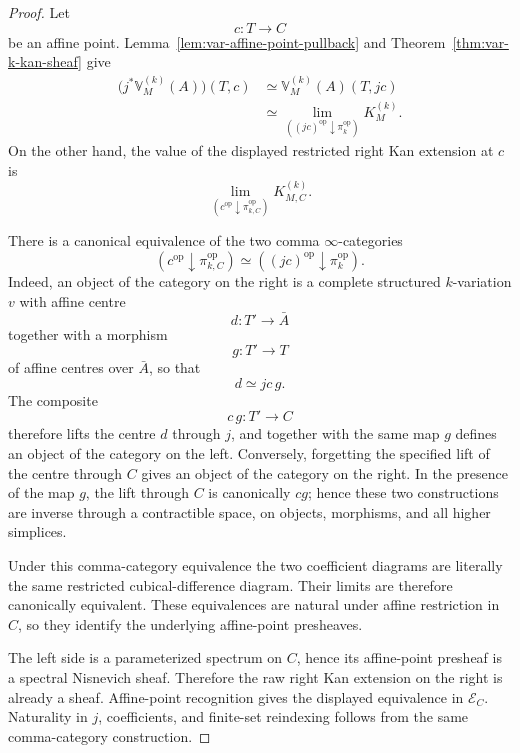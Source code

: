 \begin{proof}
Let
\[
    c:T\longrightarrow C
\]
be an affine point.  Lemma~\ref{lem:var-affine-point-pullback} and Theorem~\ref{thm:var-k-kan-sheaf} give
\[
\begin{aligned}
    \bigl(j^*\mathbb V_M^{(k)}(A)\bigr)(T,c)
    &\simeq
    \mathbb V_M^{(k)}(A)(T,jc)\\
    &\simeq
    \lim_{
      ((jc)^{\mathrm{op}}\downarrow\pi_k^{\mathrm{op}})
    }
    K_M^{(k)}.
\end{aligned}
\]
On the other hand, the value of the displayed restricted right Kan extension at \(c\) is
\[
    \lim_{
      (c^{\mathrm{op}}\downarrow\pi_{k,C}^{\mathrm{op}})
    }
    K_{M,C}^{(k)}.
\]

There is a canonical equivalence of the two comma \(\infty\)-categories
\[
    \boxed{
    (c^{\mathrm{op}}\downarrow\pi_{k,C}^{\mathrm{op}})
    \simeq
    ((jc)^{\mathrm{op}}\downarrow\pi_k^{\mathrm{op}}).
    }
\]
Indeed, an object of the category on the right is a complete structured \(k\)-variation \(v\) with affine centre
\[
    d:T'\longrightarrow\bar A
\]
together with a morphism
\[
    g:T'\longrightarrow T
\]
of affine centres over \(\bar A\), so that
\[
    d\simeq jc\,g.
\]
The composite
\[
    c\,g:T'\longrightarrow C
\]
therefore lifts the centre \(d\) through \(j\), and together with the same map \(g\) defines an object of the category on the left.  Conversely, forgetting the specified lift of the centre through \(C\) gives an object of the category on the right.  In the presence of the map \(g\), the lift through \(C\) is canonically \(cg\); hence these two constructions are inverse through a contractible space, on objects, morphisms, and all higher simplices.

Under this comma-category equivalence the two coefficient diagrams are literally the same restricted cubical-difference diagram.  Their limits are therefore canonically equivalent.  These equivalences are natural under affine restriction in \(C\), so they identify the underlying affine-point presheaves.

The left side is a parameterized spectrum on \(C\), hence its affine-point presheaf is a spectral Nisnevich sheaf.  Therefore the raw right Kan extension on the right is already a sheaf.  Affine-point recognition gives the displayed equivalence in \(\mathcal E_C\).  Naturality in \(j\), coefficients, and finite-set reindexing follows from the same comma-category construction.
\end{proof}

